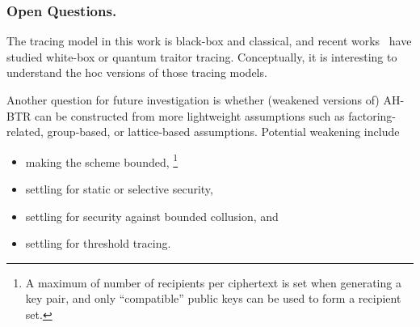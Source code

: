 \subsubsection{Open Questions.}
The tracing model in this work is black-box and classical, and recent works~\cite{C:Zhandry21,TCC:Zhandry20} have studied white-box or quantum traitor tracing.
Conceptually, it is interesting to understand the \ad hoc versions of those tracing models.

Another question for future investigation is whether
(weakened versions of) AH-BTR can be constructed from more lightweight assumptions such as factoring-related, group-based, or lattice-based assumptions.
Potential weakening include
\begin{itemize}
\item making the scheme bounded,%
\footnote{A maximum of number of recipients per ciphertext is set when generating a key pair, and only ``compatible'' public keys can be used to form a recipient set.}
\item settling for static or selective security,
\item settling for security against bounded collusion, and
\item settling for threshold tracing.
\end{itemize}
